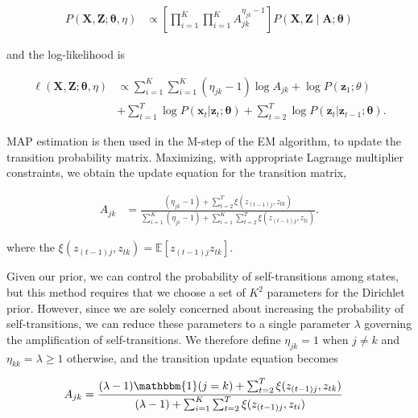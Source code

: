 \documentclass[letterpaper]{article}
\begin{document}
\vspace{-0.5cm}
\begin{align*}
    P(\mathbf{X}, \mathbf{Z} ; \mathbf{\theta}, \eta) 
    &\propto \left[\prod_{i=1}^{K}\prod_{i=1}^{K} A_{jk}^{\eta_{jk} - 1}\right] P(\mathbf{X}, \mathbf{Z} \mid \mathbf{A}; \mathbf{\theta}) 
\end{align*}
\vspace{-0.1cm}

and the log-likelihood is

\vspace{-0.5cm}
\begin{align*}
\ell(\mathbf{X}, \mathbf{Z} ; \mathbf{\theta}, \eta) 
&\propto \sum_{i=1}^{K}\sum_{i=1}^{K} (\eta_{jk} - 1)\log A_{jk} + \log P(\mathbf{z}_{1}; \theta) \\
&+ \sum_{t=1}^{T}\log P(\mathbf{x}_t|\mathbf{z}_t; \mathbf{\theta}) + \sum_{t=2}^{T}\log P(\mathbf{z}_t|\mathbf{z}_{t-1}; \mathbf{\theta}).
\end{align*}
\vspace{-0.1cm}

MAP estimation is then used in the M-step of the EM algorithm, to update the transition probability matrix. Maximizing, with appropriate Lagrange multiplier constraints, we obtain the update equation for the transition matrix, 

\vspace{-0.5cm}
\begin{align}
    A_{jk} &= \frac{(\eta_{jk} - 1) + \sum_{t=2}^{T} \xi(z_{(t-1)j}, z_{tk})}   
    {\sum_{i=1}^{K}(\eta_{ji} - 1) + \sum_{i=1}^{K}\sum_{t=2}^{T} \xi(z_{(t-1)j}, z_{ti})}.
\end{align}
\vspace{-0.1cm}

where the $\xi(z_{(t-1)j}, z_{tk})=\mathbb{E}[z_{(t-1)j}z_{tk}]$.

Given our prior, we can control the probability of self-transitions among states, but this method requires that we choose a set of $K^2$ parameters for the Dirichlet prior. However, since we are solely concerned about increasing the probability of self-transitions, we can reduce these parameters to a single parameter $\lambda$ governing the amplification of self-transitions. We therefore define $\eta_{jk} = 1$ when $j\not=k$ and $\eta_{kk}= \lambda \geq 1$ otherwise, and the transition update equation becomes

\vspace{-0.5cm}
\begin{align}\label{eq:MAP-final}
    A_{jk} &= \frac{(\lambda - 1){\mathbbm{1}(j = k)} + \sum_{t=2}^{T} \xi(z_{(t-1)j}, z_{tk})}   
    {(\lambda - 1) + \sum_{i=1}^{K}\sum_{t=2}^{T} \xi(z_{(t-1)j}, z_{ti})}
\end{align}
\vspace{-0.1cm}
\end{document}
